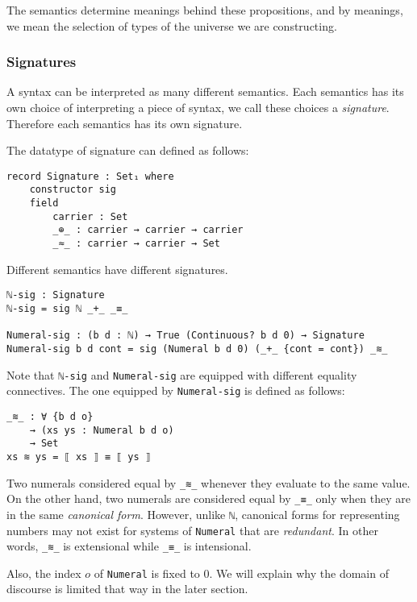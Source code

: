 \documentclass[\main/thesis.tex]{subfiles}
\begin{document}
The semantics determine meanings behind these propositions, and by meanings,
we mean the selection of types of the universe we are constructing.

\subsubsection{Signatures}

A syntax can be interpreted as many different semantics.
Each semantics has its own choice of interpreting a piece of syntax,
we call these choices a \textit{signature}.
Therefore each semantics has its own signature.

The datatype of signature can defined as follows:

\begin{lstlisting}
record Signature : Set₁ where
    constructor sig
    field
        carrier : Set
        _⊕_ : carrier → carrier → carrier
        _≈_ : carrier → carrier → Set
\end{lstlisting}

Different semantics have different signatures.

\begin{lstlisting}
ℕ-sig : Signature
ℕ-sig = sig ℕ _+_ _≡_

Numeral-sig : (b d : ℕ) → True (Continuous? b d 0) → Signature
Numeral-sig b d cont = sig (Numeral b d 0) (_+_ {cont = cont}) _≋_
\end{lstlisting}

Note that \lstinline|ℕ-sig| and \lstinline|Numeral-sig| are equipped with
different equality connectives.
The one equipped by \lstinline|Numeral-sig| is defined as follows:

\begin{lstlisting}
_≋_ : ∀ {b d o}
    → (xs ys : Numeral b d o)
    → Set
xs ≋ ys = ⟦ xs ⟧ ≡ ⟦ ys ⟧
\end{lstlisting}

Two numerals considered equal by \lstinline|_≋_| whenever they evaluate to the
same value.
On the other hand, two numerals are considered equal by \lstinline|_≡_| only
when they are in the same \textit{canonical form}.
However, unlike \lstinline|ℕ|, canonical forms for representing numbers may not
exist for systems of \lstinline|Numeral| that are \textit{redundant}.
In other words, \lstinline|_≋_| is extensional while \lstinline|_≡_| is
intensional.

Also, the index $ o $ of \lstinline|Numeral| is fixed to $ 0 $.
We will explain why the domain of discourse is limited that way in the
later section.
\end{document}
